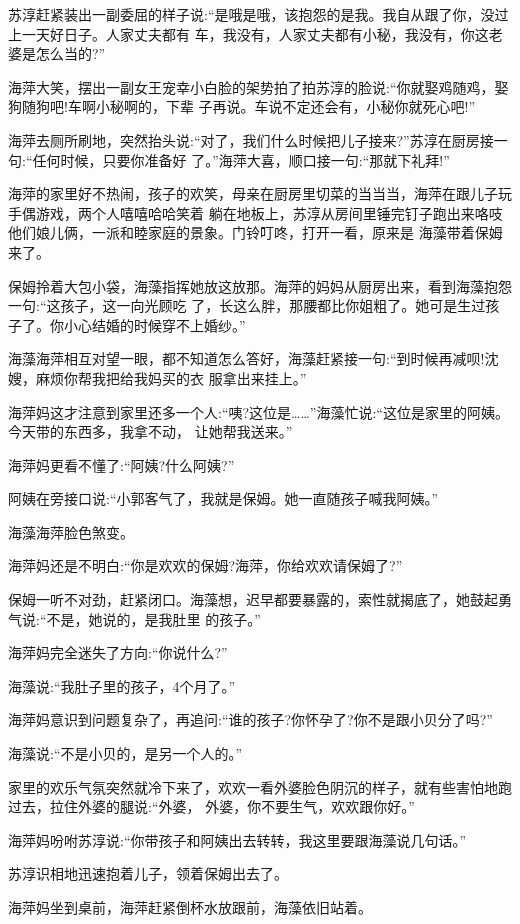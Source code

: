\documentclass[11pt,a4paper,onecolumn]{article}
\begin{document}
苏淳赶紧装出一副委屈的样子说:``是哦是哦，该抱怨的是我。我自从跟了你，没过上一天好日子。人家丈夫都有
车，我没有，人家丈夫都有小秘，我没有，你这老婆是怎么当的?''

海萍大笑，摆出一副女王宠幸小白脸的架势拍了拍苏淳的脸说:``你就娶鸡随鸡，娶狗随狗吧!车啊小秘啊的，下辈
子再说。车说不定还会有，小秘你就死心吧!''

海萍去厕所刷地，突然抬头说:``对了，我们什么时候把儿子接来?''苏淳在厨房接一句:``任何时候，只要你准备好
了。''海萍大喜，顺口接一句:``那就下礼拜!''

海萍的家里好不热闹，孩子的欢笑，母亲在厨房里切菜的当当当，海萍在跟儿子玩手偶游戏，两个人嘻嘻哈哈笑着
躺在地板上，苏淳从房间里锤完钉子跑出来咯吱他们娘儿俩，一派和睦家庭的景象。门铃叮咚，打开一看，原来是
海藻带着保姆来了。

保姆拎着大包小袋，海藻指挥她放这放那。海萍的妈妈从厨房出来，看到海藻抱怨一句:``这孩子，这一向光顾吃
了，长这么胖，那腰都比你姐粗了。她可是生过孩子了。你小心结婚的时候穿不上婚纱。''

海藻海萍相互对望一眼，都不知道怎么答好，海藻赶紧接一句:``到时候再减呗!沈嫂，麻烦你帮我把给我妈买的衣
服拿出来挂上。''

海萍妈这才注意到家里还多一个人:``咦?这位是……''海藻忙说:``这位是家里的阿姨。今天带的东西多，我拿不动，
让她帮我送来。''

海萍妈更看不懂了:``阿姨?什么阿姨?''

阿姨在旁接口说:``小郭客气了，我就是保姆。她一直随孩子喊我阿姨。''

海藻海萍脸色煞变。

海萍妈还是不明白:``你是欢欢的保姆?海萍，你给欢欢请保姆了?''

保姆一听不对劲，赶紧闭口。海藻想，迟早都要暴露的，索性就揭底了，她鼓起勇气说:``不是，她说的，是我肚里
的孩子。''

海萍妈完全迷失了方向:``你说什么?''

海藻说:``我肚子里的孩子，4个月了。''

海萍妈意识到问题复杂了，再追问:``谁的孩子?你怀孕了?你不是跟小贝分了吗?''

海藻说:``不是小贝的，是另一个人的。''

家里的欢乐气氛突然就冷下来了，欢欢一看外婆脸色阴沉的样子，就有些害怕地跑过去，拉住外婆的腿说:``外婆，
外婆，你不要生气，欢欢跟你好。''

海萍妈吩咐苏淳说:``你带孩子和阿姨出去转转，我这里要跟海藻说几句话。''

苏淳识相地迅速抱着儿子，领着保姆出去了。

海萍妈坐到桌前，海萍赶紧倒杯水放跟前，海藻依旧站着。
\end{document}
